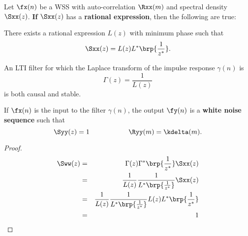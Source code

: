 \begin{theorem}
\label{thm:d-innovations}
Let $\fx(n)$ be a WSS  with auto-correlation $\Rxx(m)$
and spectral density $\Sxx(z)$.
\textbf{If} $\Sxx(z)$ has a \textbf{rational expression},
then the following are true:

\begin{enume}
   \item There exists a rational expression $L(z)$ with minimum phase
         such that
         \[ \Sxx(z) = L(z)L^\ast\brp{\frac{1}{z^\ast}}. \]
   \item An LTI filter for which the Laplace transform of
         the impulse response $\gamma(n)$ is
         \[ \Gamma(z) = \frac{1}{L(z)} \]
         is both causal and stable.
   \item If $\fx(n)$ is the input to the filter $\gamma(n)$,
         the output $\fy(n)$ is a \textbf{white noise sequence} such that
         \[ \Syy(z)=1 \hspace{2cm} \Ryy(m)=\kdelta(m).\]
\end{enume}
\end{theorem}


\begin{proof}
\begin{eqnarray*}
   \Sww(z)
     &=& \Gamma(z)\Gamma^\ast\brp{\frac{1}{z^\ast}} \Sxx(z)
   \\&=& \frac{1}{L(z)} \frac{1}{L^\ast\brp{\frac{1}{z^\ast}}} \Sxx(z)
   \\&=& \frac{1}{L(z)} \frac{1}{L^\ast\brp{\frac{1}{z^\ast}}}
         L(z) L^\ast\brp{\frac{1}{z^\ast}}
   \\&=& 1
\end{eqnarray*}
\end{proof}


